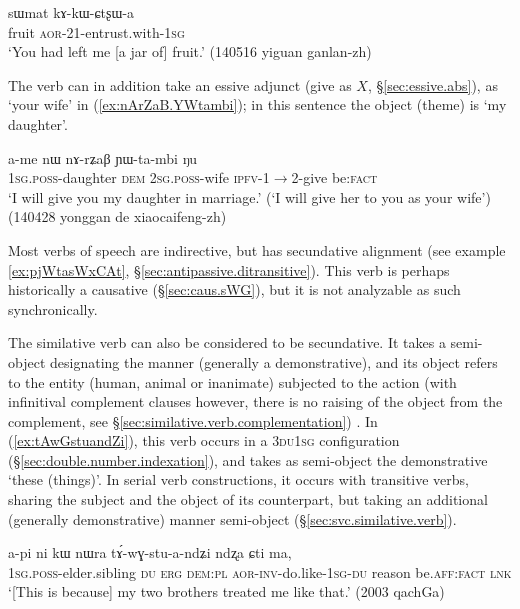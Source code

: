 \begin{exe}
	\ex \label{sec:kAkWCtsxWa}
	\gll  sɯmat kɤ-kɯ-ɕtʂɯ-a \\
	fruit \textsc{aor}-2\fl{}1-entrust.with-\textsc{1sg} \\
	\glt `You had left me [a jar of] fruit.' (140516 yiguan ganlan-zh) 
\end{exe}

The verb  can in addition take an essive adjunct (give as $X$, §\ref{sec:essive.abs}), as  `your wife' in (\ref{ex:nArZaB.YWtambi}); in this sentence the object (theme) is  `my daughter'.

\begin{exe}
	\ex \label{ex:nArZaB.YWtambi}
	\gll   a-me nɯ nɤ-rʑaβ ɲɯ-ta-mbi ŋu \\
	\textsc{1sg}.\textsc{poss}-daughter \textsc{dem} \textsc{2sg}.\textsc{poss}-wife \textsc{ipfv}-1$\rightarrow$2-give be:\textsc{fact} \\
	\glt `I will give you my daughter in marriage.' (`I will give her to you as your wife') (140428 yonggan de xiaocaifeng-zh)
\end{exe}

Most verbs of speech are indirective, but  has secundative alignment (see example \ref{ex:pjWtasWxCAt}, §\ref{sec:antipassive.ditransitive}). This verb is perhaps historically a causative (§\ref{sec:caus.sWG}), but it is not analyzable as such synchronically. 

The similative verb  can also be considered to be secundative. It takes a semi-object designating the manner (generally a demonstrative), and its object refers to the entity (human, animal or inanimate) subjected to the action (with infinitival complement clauses however, there is no raising of the object from the complement, see §\ref{sec:similative.verb.complementation}) . In (\ref{ex:tAwGstuandZi}), this verb occurs in a \textsc{3du}\fl{}\textsc{1sg} configuration (§\ref{sec:double.number.indexation}), and takes as semi-object the demonstrative  `these (things)'. In serial verb constructions, it occurs with transitive verbs, sharing the subject and the object of its counterpart, but taking an additional (generally demonstrative) manner semi-object (§\ref{sec:svc.similative.verb}). 

\begin{exe}
	\ex \label{ex:tAwGstuandZi}
	\gll   a-pi ni kɯ nɯra tɤ́-wɣ-stu-a-ndʑi ndʐa ɕti ma, \\
	\textsc{1sg}.\textsc{poss}-elder.sibling \textsc{du} \textsc{erg} \textsc{dem}:\textsc{pl} \textsc{aor}-\textsc{inv}-do.like-\textsc{1sg}-\textsc{du} reason be.\textsc{aff}:\textsc{fact} \textsc{lnk} \\
	\glt `[This is because] my two brothers treated me like that.' (2003 qachGa)
\end{exe}


